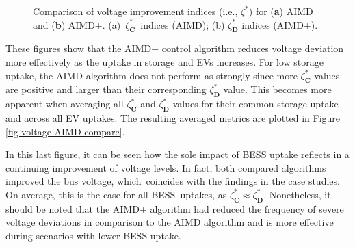 \begin{figure}\centering
 \vspace{-5pt}
\caption{Comparison of voltage improvement indices (i.e., $\zeta^{*}$) for (\textbf{a}) AIMD and (\textbf{b}) AIMD+. ({a})~$\zeta_\textbf{C}^{*}$~indices (AIMD); ({b}) $\zeta_\textbf{D}^{*}$ indices (AIMD+).}
 \label{fig-voltage-comparison-large}
\end{figure}

These figures show that the AIMD+ control algorithm reduces voltage deviation more effectively as the uptake in storage and EVs increases. For low storage uptake, the AIMD algorithm does not perform as strongly since more $\zeta_\textbf{C}^{*}$ values are positive and larger than their corresponding $\zeta_\textbf{D}^{*}$ value. This becomes more apparent when averaging all $\zeta_\textbf{C}^{*}$ and $\zeta_\textbf{D}^{*}$ values for their common storage uptake and across all EV uptakes. The resulting averaged metrics are plotted in Figure \ref{fig-voltage-AIMD-compare}.

In this last figure, it can be seen how the sole impact of BESS uptake reflects in a continuing improvement of voltage levels. In fact, both compared algorithms improved the bus voltage, which~coincides with the findings in the case studies. On average, this is the case for all BESS~uptakes, as $\zeta_\textbf{C}^{*} \approx \zeta_\textbf{D}^{*}$. Nonetheless, it should be noted that the AIMD+ algorithm had reduced the frequency of severe voltage deviations in comparison to the AIMD algorithm and is more effective during scenarios with lower BESS uptake.

